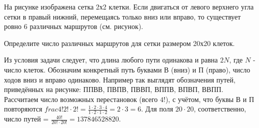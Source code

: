 
На рисунке изображена сетка 2х2 клетки. Если двигаться от левого верхнего угла сетки в правый нижний, перемещаясь только вниз или вправо, то существует ровно 6 различных маршрутов (см. рисунок). 

Определите число различных маршрутов для сетки размером 20х20 клеток. 


\solutionSection

Из условия задачи следует, что длина любого пути одинакова и равна $2N$, где $N$ - число клеток. Обозначим конкретный путь буквами В (вниз) и П (право), число ходов вниз и вправо одинаково. Например так выглядят обозначения путей, приведённых на рисунке: ППВВ, ПВПВ, ПВВП, ВППВ, ВПВП, ВВПП. Рассчитаем число возможных перестановок (всего $4!$), с учётом, что буквы В и П повторяются $frac{4!}{2!  \cdot  2!} = \frac{1 \cdot 2 \cdot 3 \cdot 4}{1 \cdot 2 \cdot 1 \cdot 2} = 2 \cdot 3 = 6$. Для поля $20 \cdot 20$, соответственно, число путей = $\frac{40!}{20!  \cdot  20!} = 137846528820$.


